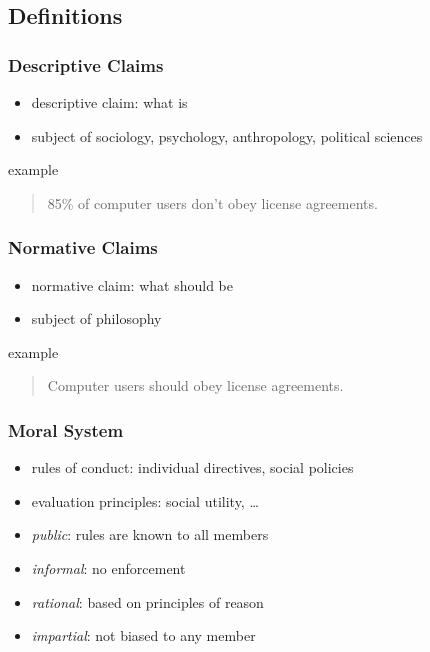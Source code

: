 \documentclass[dvipsnames]{beamer}
\theoremstyle{plain}
\begin{document}
\subsection{Definitions}

\begin{frame}
  \frametitle{Descriptive Claims}

  \begin{itemize}
    \item \alert{descriptive} claim: what is
    \item subject of sociology, psychology, anthropology, political sciences
  \end{itemize}

  \pause
  \begin{exampleblock}{example}
    \begin{quote}
      85\% of computer users don't obey license agreements.
    \end{quote}
  \end{exampleblock}
\end{frame}

\begin{frame}
  \frametitle{Normative Claims}

  \begin{itemize}
    \item \alert{normative} claim: what should be
    \item subject of philosophy
  \end{itemize}

  \pause
  \begin{exampleblock}{example}
    \begin{quote}
      Computer users should obey license agreements.
    \end{quote}
  \end{exampleblock}
\end{frame}

\begin{frame}
  \frametitle{Moral System}

  \begin{itemize}
    \item rules of conduct: individual directives, social policies
    \item evaluation principles: social utility, \ldots

    \pause
    \bigskip
    \item \emph{public}: rules are known to all members
    \item \emph{informal}: no enforcement
    \item \emph{rational}: based on principles of reason
    \item \emph{impartial}: not biased to any member
  \end{itemize}
\end{frame}
\end{document}
